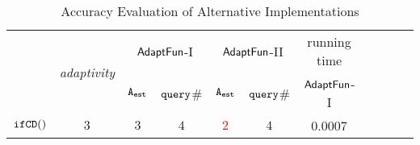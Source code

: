 {\scriptsize
\begin {table}[t]
\vspace{-0.2cm}
    \caption{Accuracy Evaluation of {\THESYSTEM}  Alternative Implementations}
    \vspace{-0.3cm}
        \label{tb:adapt-imp-alternatives}
        \begin{center}
        \centering
{\scriptsize
        \begin{tabular}{ | >{\tiny}l | c | c | c | c | c | c | c | c | c  |c}
        \hline \hline
        \multirow{2}{*}{Program $c$}
        &\multirow{2}{*}{\emph{adaptivity}}
         & \multicolumn{2}{c|}{$\textsf{AdaptFun}$-I}
         & \multicolumn{2}{c|}{$\textsf{AdaptFun}$-II}
         & {running time} \\ 
         \cline{3-9}
        & & {${\mathtt{A_{est}}}$ } & {${\tt query}$\# } & {${\mathtt{A_{est}}}$ } & {${\tt query}$\# }  & $\textsf{AdaptFun}$-I \\
         \cline{8-9}
         \hline \hline
          $  \mathtt{ifCD()}$  &  $3$  & $3$ &   $4$  & \textcolor{red}{$2$} & $4$ & 0.0007 \\

\end{tabular}}
\end{center}
\end{table}}

